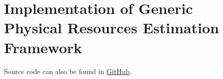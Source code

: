%
%
\chapter{Implementation of Generic Physical Resources Estimation Framework}


Source code can also be found in \href{https://github.com/cesarzc/qc-resources-estimation}{GitHub}.
